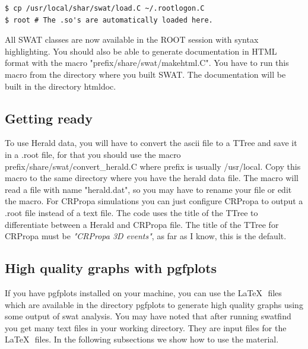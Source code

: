 \documentclass[12pt]{article}
\begin{document}
{\bf \color{brown}
\begin{lstlisting}
$ cp /usr/local/shar/swat/load.C ~/.rootlogon.C
$ root # The .so's are automatically loaded here.
\end{lstlisting}
}

All SWAT classes are now available in the ROOT session with syntax
highlighting. You should also be able to generate documentation in HTML format
with the macro {\color{brown}"prefix/share/swat/makehtml.C"}. You have to run
this macro from the directory where you built SWAT. The documentation will be
built in the directory {\color{brown}htmldoc}.

\subsection{Getting ready} \label{ch::ready}
To use Herald data, you will have to convert the ascii file to a {TTree} and
save it in a .root file, for that you should use the macro
{\color{brown}prefix/share/swat/convert\_herald.C} where prefix is usually
{\color{brown}/usr/local}.  Copy this macro to the same directory where you have the
herald data file. The macro will read a file with name
{\color{brown}"herald.dat"}, so you may have to rename your file or edit the macro. 
For CRPropa simulations you can just configure CRPropa to output a .root file
instead of a text file.  The code uses the title of the TTree to differentiate
between a Herald and CRPropa file. The title of the TTree for CRPropa must be
\textit{\color{brown}"CRPropa 3D events"}, as far as I know, this is the default.

\subsection{High quality graphs with pgfplots} \label{ch::pgfplots}
If you have pgfplots installed on your machine, you can use the \LaTeX\,\,
files which are available in the directory pgfplots to generate high quality
graphs using some output of swat analysis. You may have noted that after
running {\color{brown}swatfind} you get many text files in your working
directory. They are input files for the \LaTeX\,\, files. In the following
subsections we show how to use the material.
\end{document}
